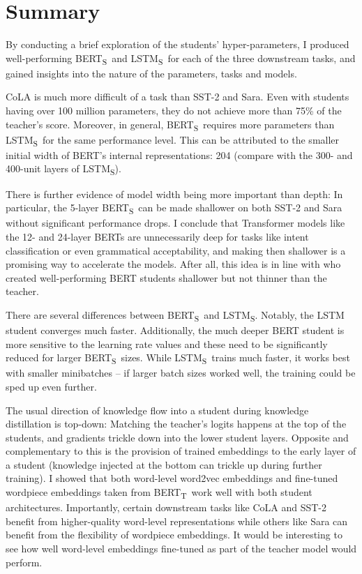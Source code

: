 \documentclass[bsc,frontabs,singlespacing,parskip,deptreport]{infthesis}
\def\BERTT{BERT\textsubscript{T}}
\def\BERTS{BERT\textsubscript{S}}
\def\LSTMS{LSTM\textsubscript{S}}
\begin{document}
{  \section{Summary}{
    By conducting a brief exploration of the students' hyper-parameters, I produced well-performing \BERTS~and \LSTMS~for each of the three downstream tasks, and gained insights into the nature of the parameters, tasks and models.

    CoLA is much more difficult of a task than SST-2 and Sara. Even with students having over 100 million parameters, they do not achieve more than 75\% of the teacher's score. Moreover, in general, \BERTS~requires more parameters than \LSTMS~for the same performance level. This can be attributed to the smaller initial width of BERT's internal representations: 204 (compare with the 300- and 400-unit layers of \LSTMS).

    There is further evidence of model width being more important than depth: In particular, the 5-layer \BERTS~can be made shallower on both SST-2 and Sara without significant performance drops. I conclude that Transformer models like the 12- and 24-layer BERTs are unnecessarily deep for tasks like intent classification or even grammatical acceptability, and making then shallower is a promising way to accelerate the models. After all, this idea is in line with \citet{Sanh_2019} who created well-performing BERT students shallower but not thinner than the teacher.

    There are several differences between \BERTS~and \LSTMS. Notably, the LSTM student converges much faster. Additionally, the much deeper BERT student is more sensitive to the learning rate values and these need to be significantly reduced for larger \BERTS~sizes. While \LSTMS~trains much faster, it works best with smaller minibatches -- if larger batch sizes worked well, the training could be sped up even further.

    The usual direction of knowledge flow into a student during knowledge distillation is top-down: Matching the teacher's logits happens at the top of the students, and gradients trickle down into the lower student layers.
    Opposite and complementary to this is the provision of trained embeddings to the early layer of a student (knowledge injected at the bottom can trickle up during further training).
    I showed that both word-level word2vec embeddings and fine-tuned wordpiece embeddings taken from \BERTT~work well with both student architectures. Importantly, certain downstream tasks like CoLA and SST-2 benefit from higher-quality word-level representations while others like Sara can benefit from the flexibility of wordpiece embeddings. It would be interesting to see how well word-level embeddings fine-tuned as part of the teacher model would perform.

}}
\end{document}

